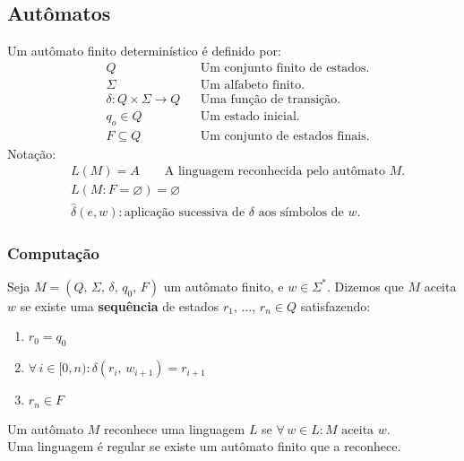 \documentclass[11pt]{article}
\begin{document}
\subsection{Autômatos}
\label{sec:orgaefb11e}
Um autômato finito determinístico é definido por:
\begin{align*}
  & Q && \text{Um conjunto finito de estados.} \\
  & \Sigma && \text{Um alfabeto finito.} \\
  & \delta: Q \times \Sigma \to Q && \text{Uma função de transição.} \\
  & q_o \in Q && \text{Um estado inicial.} \\
  & F \subseteq Q && \text{Um conjunto de estados finais.}
\end{align*}
Notação:
\begin{align*}
  & L(M) = A \qquad \text{A linguagem reconhecida pelo autômato $M$.} \\[5pt]
  & L(M: F = \varnothing) = \varnothing \\[5pt]
  & \hat{\delta}(e, w): \text{aplicação sucessiva de }\delta\text{ aos símbolos de }w.
\end{align*}
\subsubsection{Computação}
\label{sec:orgf450fc4}
Seja \(M = (Q,\, \Sigma,\, \delta,\, q_0,\, F)\) um autômato finito, e \(w \in \Sigma^*\).
Dizemos que \(M\) aceita \(w\) se existe uma \textbf{sequência} de estados
\(r_1, \,\hdots,\, r_n \in Q\) satisfazendo:
\begin{enumerate}
\item \(r_0 = q_0\)
\item \(\forall\, i \in [0, n): \delta(r_i,\, w_{i + 1}) = r_{i + 1}\)
\item \(r_n \in F\)
\end{enumerate}
Um autômato \(M\) reconhece uma linguagem \(L\) se \(\forall\, w \in L: M \text{ aceita } w\). \\
Uma linguagem é regular se existe um autômato finito que a reconhece.
\end{document}
